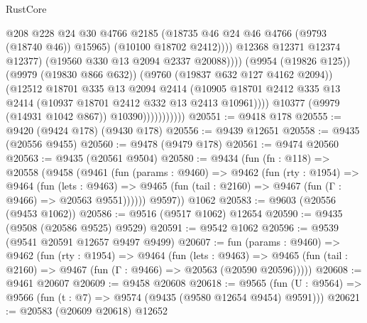 \begin{lexlean}{RustCore}
\begin{coremodule}
                                          @208
                                          @228
                                          @24
                                          @30
                                          @4766
                                          @2185
                                          (@18735 @46 @24 @46 @4766 (@9793 (@18740 @46)) @15965)
                                          (@10100 @18702 @2412))))
                                    @12368
                                    @12371
                                    @12374
                                    @12377)
                                  (@19560 @330 @13 @2094 @2337 @20088))))
                            (@9954 (@19826 @125))
                            (@9979 (@19830 @866 @632))
                            (@9760 (@19837 @632 @127 @4162 @2094))
                            (@12512
                              @18701
                              @335
                              @13
                              @2094
                              @2414
                              (@10905
                                @18701
                                @2412
                                @335
                                @13
                                @2414
                                (@10937 @18701 @2412 @332 @13 @2413 @10961))))
                          @10377
                          (@9979 (@14931 @1042 @867))
                          @10390)))))))))))
@20551 := @9418 @178
@20555 := @9420 (@9424 @178) (@9430 @178)
@20556 := @9439 @12651
@20558 := @9435 (@20556 @9455)
@20560 := @9478 (@9479 @178)
@20561 := @9474 @20560
@20563 := @9435 (@20561 @9504)
@20580 := @9434
    (fun (fn : @118) =>
    @20558
      (@9458
        (@9461
          (fun (params : @9460) =>
          @9462
            (fun (rty : @1954) =>
            @9464
              (fun (lets : @9463) =>
              @9465 (fun (tail : @2160) => @9467 (fun (Γ : @9466) => @20563 @9551))))))
        @9597))
    @1062
@20583 := @9603 (@20556 (@9453 @1062))
@20586 := @9516 (@9517 @1062) @12654
@20590 := @9435 (@9508 (@20586 @9525) @9529)
@20591 := @9542 @1062
@20596 := @9539 (@9541 @20591 @12657 @9497 @9499)
@20607 := fun (params : @9460) =>
  @9462
    (fun (rty : @1954) =>
    @9464
      (fun (lets : @9463) =>
      @9465 (fun (tail : @2160) => @9467 (fun (Γ : @9466) => @20563 (@20590 @20596)))))
@20608 := @9461 @20607
@20609 := @9458 @20608
@20618 := @9565
    (fun (U : @9564) => @9566 (fun (t : @7) => @9574 (@9435 (@9580 @12654 @9454) @9591)))
@20621 := @20583 (@20609 @20618) @12652

\end{coremodule}
\end{lexlean}
